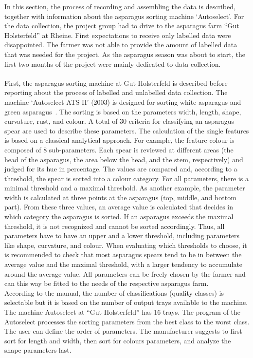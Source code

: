 In this section, the process of recording and assembling the data is described, together with information about the asparagus sorting machine ‘Autoselect’.
For the data collection, the project group had to drive to the asparagus farm “Gut Holsterfeld” at Rheine. First expectations to receive only labelled data were disappointed. The farmer was not able to provide the amount of labelled data that was needed for the project. As the asparagus season was about to start, the first two months of the project were mainly dedicated to data collection. \\
 \\
First, the asparagus sorting machine at Gut Holsterfeld is described before reporting about the process of labelled and unlabelled data collection.
The machine ‘Autoselect ATS II’ (2003) is designed for sorting white asparagus and green asparagus~\citep{autoselectanleitung}. The sorting is based on the parameters width, length, shape, curvature, rust, and colour. A total of 30 criteria for classifying an asparagus spear are used to describe these parameters. The calculation of the single features is based on a classical analytical approach. For example, the feature colour is composed of 8 sub-parameters. Each spear is reviewed at different areas (the head of the asparagus, the area below the head, and the stem, respectively) and judged for its hue in percentage. The values are compared and, according to a threshold, the spear is sorted into a colour category. For all parameters, there is a minimal threshold and a maximal threshold. As another example, the parameter width is calculated at three points at the asparagus (top, middle, and bottom part). From these three values, an average value is calculated that decides in which category the asparagus is sorted. If an asparagus exceeds the maximal threshold, it is not recognized and cannot be sorted accordingly. Thus, all parameters have to have an upper and a lower threshold, including parameters like shape, curvature, and colour. When evaluating which thresholds to choose, it is recommended to check that most asparagus spears tend to be in between the average value and the maximal threshold, with a larger tendency to accumulate around the average value. All parameters can be freely chosen by the farmer and can this way be fitted to the needs of the respective asparagus farm. \\
According to the manual, the number of classifications (quality classes) is selectable but it is based on the number of output trays available to the machine. The machine Autoselect at “Gut Holsterfeld” has 16 trays. The program of the Autoselect processes the sorting parameters from the best class to the worst class. The user can define the order of parameters. The manufacturer suggests to first sort for length and width, then sort for colours parameters, and analyze the shape parameters last. \\
